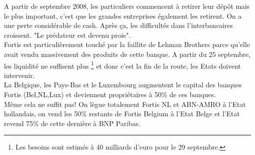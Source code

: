 A partir de septembre 2008, les particuliers commencent à retirer leur dépôt mais le plus important, c'est que les grandes entreprises également les retirent. On a une perte considérable de cash. Après ça, les difficultés dans l'interbancaires croissent. "Le prédateur est devenu proie". \\
Fortis est particulièrement touché par la faillite de Lehman Brothers parce qu'elle avait vendu massivement des produits de cette banque. A partir du 25 septembre, les liquidité ne suffisent plus \footnote{Les besoins sont estimés à 40 milliards d'euro pour le 29 septembre.} et donc c'est la fin de la route, les Etats doivent intervenir. \\
La Belgique, les Pays-Bas et le Luxembourg augmentent le capital des banques Fortis (Bel,NL,Lux) et deviennent propriétaires à 50\% de ces banques. \\
Même cela ne suffit pas! On lègue totalement Fortis NL et ABN-AMRO à l'Etat hollandais, on vend les 50\% restants de Fortis Belgium à l'Etat Belge et l'Etat revend 75\% de cette dernière à BNP Paribas.